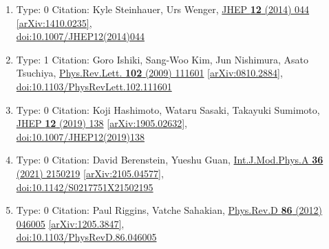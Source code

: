 \documentclass[a4paper,10pt]{article}
\begin{document}
\begin{enumerate}
\begin{enumerate}
  \item Type: 0 Citation: Kyle Steinhauer, Urs Wenger, \href{https://www.doi.org/10.1007/JHEP12(2014)044}{JHEP {\bf 12} (2014) 044}  \href{https://arxiv.org/abs/1410.0235}{[arXiv:1410.0235]},\\\href{https://www.doi.org/10.1007/JHEP12(2014)044}{doi:10.1007/JHEP12(2014)044}
  \item Type: 1 Citation: Goro Ishiki, Sang-Woo Kim, Jun Nishimura, Asato Tsuchiya, \href{https://www.doi.org/10.1103/PhysRevLett.102.111601}{Phys.Rev.Lett. {\bf 102} (2009) 111601}  \href{https://arxiv.org/abs/0810.2884}{[arXiv:0810.2884]},\\\href{https://www.doi.org/10.1103/PhysRevLett.102.111601}{doi:10.1103/PhysRevLett.102.111601}
  \item Type: 0 Citation: Koji Hashimoto, Wataru Sasaki, Takayuki Sumimoto, \href{https://www.doi.org/10.1007/JHEP12(2019)138}{JHEP {\bf 12} (2019) 138}  \href{https://arxiv.org/abs/1905.02632}{[arXiv:1905.02632]},\\\href{https://www.doi.org/10.1007/JHEP12(2019)138}{doi:10.1007/JHEP12(2019)138}
  \item Type: 0 Citation: David Berenstein, Yueshu Guan, \href{https://www.doi.org/10.1142/S0217751X21502195}{Int.J.Mod.Phys.A {\bf 36} (2021) 2150219}  \href{https://arxiv.org/abs/2105.04577}{[arXiv:2105.04577]},\\\href{https://www.doi.org/10.1142/S0217751X21502195}{doi:10.1142/S0217751X21502195}
  \item Type: 0 Citation: Paul Riggins, Vatche Sahakian, \href{https://www.doi.org/10.1103/PhysRevD.86.046005}{Phys.Rev.D {\bf 86} (2012) 046005}  \href{https://arxiv.org/abs/1205.3847}{[arXiv:1205.3847]},\\\href{https://www.doi.org/10.1103/PhysRevD.86.046005}{doi:10.1103/PhysRevD.86.046005}

\end{enumerate}
\end{enumerate}
\end{document}
